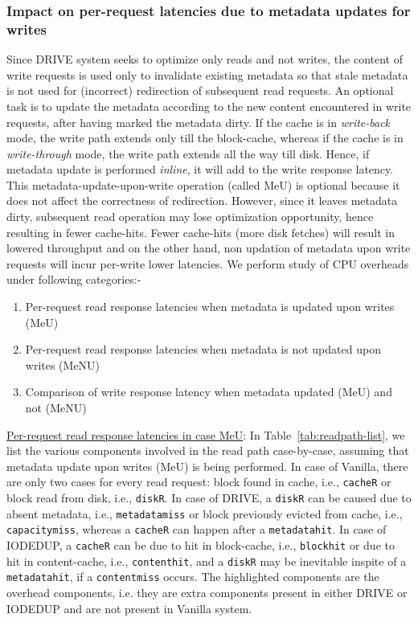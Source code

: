 \subsubsection{Impact on per-request latencies due to metadata updates for writes}
\label{sec:drivechap-reqlatency}
Since DRIVE system seeks to optimize only reads and not writes, the
content of write requests is used only to invalidate existing metadata
so that stale metadata is not used for (incorrect) redirection of
subsequent read requests.
An optional task is to update the metadata
according to
the new content encountered in write requests, after having marked the
metadata dirty.
If the cache is in \textit{write-back} mode, the write path
extends
only till the block-cache, whereas if the cache is in
\textit{write-through} mode,
the write path extends all the way till disk. Hence, if metadata
update is performed \textit{inline}, it will add to the write
response latency. This metadata-update-upon-write operation
(called MeU)
is optional because it does not affect the correctness of redirection.
However, since it leaves metadata dirty, subsequent read operation may
lose optimization opportunity, hence resulting in fewer cache-hits.
Fewer cache-hits (more disk fetches) will result in
lowered throughput and on the other hand, non updation of metadata
upon write requests will incur per-write lower latencies.
We perform
study of CPU overheads under following categories:-
\begin{enumerate}
		\singlespacing
 \item Per-request read response latencies when metadata is updated 
upon writes (MeU)
\item Per-request read response latencies when metadata is not updated
upon writes (MeNU)
\item Comparison of write response latency when metadata updated (MeU)
and not (MeNU)
\end{enumerate}

\vspace{-0.1in}
\underline{Per-request read response latencies in case MeU}:
In Table~\ref{tab:readpath-list}, we list the various components involved
in the read path case-by-case, assuming that metadata update upon
writes (MeU) is being performed. In case of Vanilla, there
are only two cases for every read request:
block found in cache, i.e., \texttt{cacheR} or
block read from disk, i.e., \texttt{diskR}.
In case of DRIVE, a \texttt{diskR} can be caused due
to absent metadata, i.e., \texttt{metadatamiss} or block previously
evicted from cache, i.e., \texttt{capacitymiss}, 
whereas a \texttt{cacheR} can happen after a \texttt{metadatahit}.
In case of IODEDUP, a \texttt{cacheR} can be
due to hit in block-cache, i.e., \texttt{blockhit} or
due to hit in content-cache, i.e., \texttt{contenthit},
and a \texttt{diskR} may be inevitable inspite of a \texttt{metadatahit}, if
a \texttt{contentmiss} occurs.
The highlighted components are the overhead components, i.e. they are extra
components present in either DRIVE or IODEDUP and are not present in Vanilla
system.



